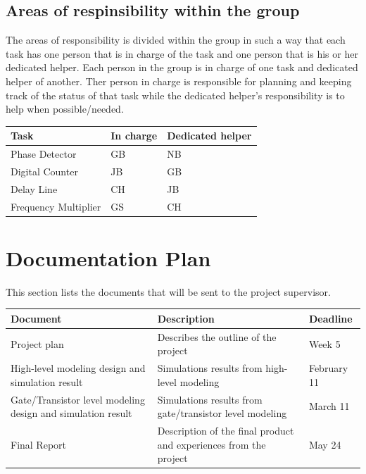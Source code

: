 \documentclass[a4paper,12pt]{article} \usepackage{graphicx}
\begin{document}
\subsection{Areas of respinsibility within the group}
The areas of responsibility is divided within the group in such a way that each
task has one person that is in charge of the task and one person that is his or
her dedicated helper. Each person in the group is in charge of one task and 
dedicated helper of another. Ther person in charge is responsible for planning 
and keeping track of the status of that task while the dedicated helper's 
responsibility is to help when possible/needed.

\begin{longtable}{|p{40mm}|p{50mm}|p{50mm}|}
        \hline
        \textbf{Task} & \textbf{In charge} & \textbf{Dedicated helper} \\
        \hline
        Phase Detector & GB & NB \\
        \hline
        Digital Counter & JB & GB \\
        \hline
        Delay Line  & CH & JB \\
        \hline
        Frequency Multiplier & GS & CH \\
        \hline
\end{longtable}



\section{Documentation Plan}
This section lists the documents that will be sent to the project supervisor.

\begin{longtable}{|p{40mm}|p{80mm}|p{30mm}|}
        \hline
        \textbf{Document} & \textbf{Description} & \textbf{Deadline} \\
        \hline
        Project plan & Describes the outline of the project & Week 5 \\
        \hline
        High-level modeling design and simulation result & Simulations results from high-level modeling & February 11 \\
        \hline
        Gate/Transistor level modeling design and simulation result  & Simulations results from gate/transistor level modeling & March 11 \\
        \hline
        Final Report & Description of the final product and experiences from the project & May 24 \\
        \hline
\end{longtable}
\end{document}
